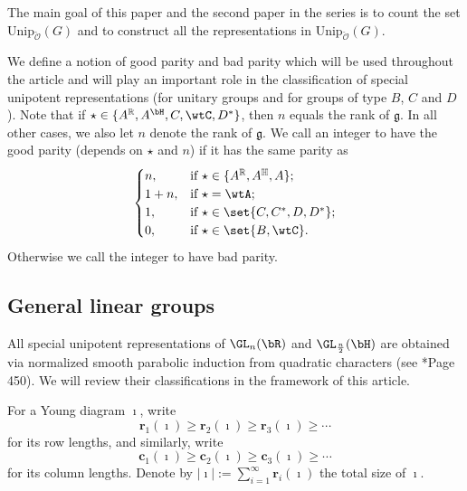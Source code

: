 \documentclass[12pt]{amsart}
\def\abs#1{\left|{#1}\right|}
\newcommand{\BH}{{\mathbb {H}}}
\newcommand{\CK}{{\mathcal {K}}}
\newcommand{\CO}{{\mathcal {O}}}
\newcommand{\g}{\mathfrak g}
\newcommand{\R}{\mathbb R}
\numberwithin{equation}{section}
\theoremstyle{remark}
\def\Unip{\mathrm{Unip}}
\def\LC{{}^{\scriptscriptstyle L}\sC}
\def\Coh{\mathrm{Coh}}
\newcommand{\Lam}{{[\lambda]}}
\begin{document}
The main goal of this paper and the second paper in the series \cite{BMSZ2} is to count the set $\Unip_{\check \CO}(G)$ and to construct all the representations in $\Unip_{\check \CO}(G)$.

We define a notion of good parity and bad parity which will be used throughout the article and will play an important role in the classification of special unipotent representations (for unitary groups and for groups of type $B$, $C$ and $D$).
Note that if $\star\in \{A^\R, A^\bH, C, \wtC, D^*\}$, then $n$ equals the rank of $\g$. In all other cases, we also let $n$ denote the rank of $\g$.
We call an integer to have the good parity (depends on $\star$ and $n$) if it has the same parity as
\begin{equation}\label{parity}
  \begin{cases}
    n, &  \text{if $\star \in \{A^\R, A^\BH,  A\}$}; \\
    1+ n, &  \text{if $\star = \wtA$}; \\
   1, & \text{if } \star \in \set{C,C^{*},D,D^{*}};\\
 \text{0}, & \text{if } \star \in \set{B,\wtC}.\\
  \end{cases}
\end{equation}
Otherwise we call the integer to have bad parity.


\subsection{General linear groups}\label{sec:GLRH}


All special unipotent representations of $\GL_n(\bR)$ and $\GL_{\frac{n}{2}}(\bH)$  are obtained via normalized smooth parabolic induction from quadratic characters (see \cite{V.GL}*{Page 450}).
We will review their classifications in the framework of this article.


  For a Young diagram $\imath$, write
 \[
   \mathbf r_1(\imath)\geq \mathbf r_2(\imath)\geq \mathbf r_3(\imath)\geq \cdots
 \]
 for its row lengths, and similarly, write
 \[
   \mathbf c_1(\imath)\geq \mathbf c_2(\imath)\geq \mathbf c_3(\imath)\geq \cdots
 \]
 for its column lengths. Denote by
 $\abs{\imath}:=\sum_{i=1}^\infty \mathbf r_i(\imath)$ the total size of
 $\imath$.
\end{document}
